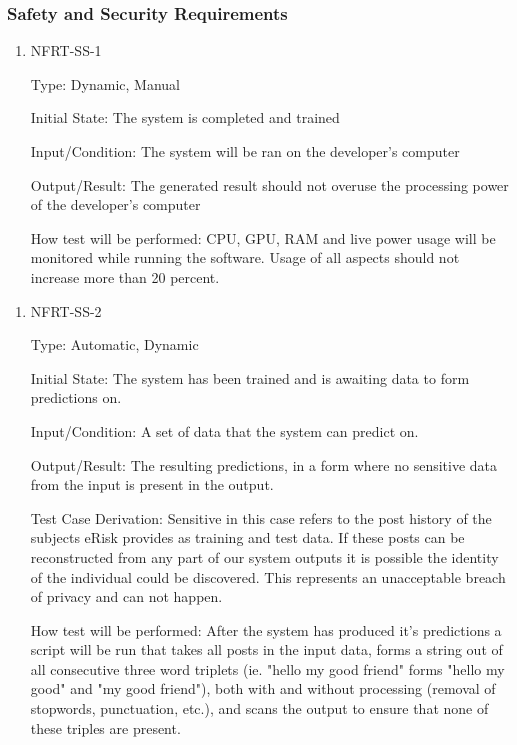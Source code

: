 \documentclass[12pt, titlepage]{article}
\begin{document}
\subsubsection{Safety and Security Requirements}


\begin{enumerate}

\item{NFRT-SS-1\\}

Type: Dynamic, Manual
					
Initial State: The system is completed and trained 
					
Input/Condition: The system will be ran on the developer's computer
					
Output/Result: The generated result should not overuse the processing power of the developer's computer
					
How test will be performed: CPU, GPU, RAM and live power usage will be monitored while running the software. Usage of all aspects should not increase more than 20 percent.   
					
\end{enumerate}

\begin{enumerate}

	\item{NFRT-SS-2\\}
	
	Type: Automatic, Dynamic
						
	Initial State: The system has been trained and is awaiting data to form predictions on.
						
	Input/Condition: A set of data that the system can predict on.
						
	Output/Result: The resulting predictions, in a form where no sensitive data from the input is present in the output.
	
	Test Case Derivation: Sensitive in this case refers to the post history of the subjects eRisk provides as training and test data. If these posts can be reconstructed from any part of our system outputs it is possible the identity of the individual could be discovered. This represents an unacceptable breach of privacy and can not happen.
						
	How test will be performed: After the system has produced it's predictions a script will be run that takes all posts in the input data, forms a string out of all consecutive three word triplets (ie. "hello my good friend" forms "hello my good" and "my good friend"), both with and without processing (removal of stopwords, punctuation, etc.), and scans the output to ensure that none of these triples are present.
	
\end{enumerate}
\end{document}

